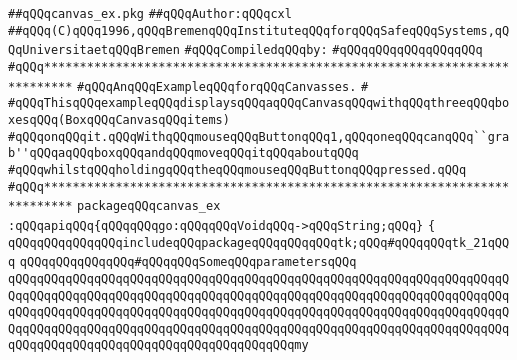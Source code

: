 \label{src/lib/tk/src/tests+examples/canvas_ex.pkg}
\verb|##qQQqcanvas_ex.pkg|\newline
\verb|##qQQqAuthor:qQQqcxl|\newline
\verb|##qQQq(C)qQQq1996,qQQqBremenqQQqInstituteqQQqforqQQqSafeqQQqSystems,qQQqUniversitaetqQQqBremen|\newline
\newline
\verb|#qQQqCompiledqQQqby:|\newline
\verb|#qQQqqQQqqQQqqQQqqQQq|\newline
\newline
\newline
\newline
\verb|#qQQq**************************************************************************|\newline
\verb|#qQQqAnqQQqExampleqQQqforqQQqCanvasses.|\newline
\verb|#|\newline
\verb|#qQQqThisqQQqexampleqQQqdisplaysqQQqaqQQqCanvasqQQqwithqQQqthreeqQQqboxesqQQq(BoxqQQqCanvasqQQqitems)|\newline
\verb|#qQQqonqQQqit.qQQqWithqQQqmouseqQQqButtonqQQq1,qQQqoneqQQqcanqQQq``grab''qQQqaqQQqboxqQQqandqQQqmoveqQQqitqQQqaboutqQQq|\newline
\verb|#qQQqwhilstqQQqholdingqQQqtheqQQqmouseqQQqButtonqQQqpressed.qQQq|\newline
\verb|#qQQq**************************************************************************|\newline
\newline
\newline
\verb|packageqQQqcanvas_ex|\newline
\newline
\verb|:qQQqapiqQQq{qQQqqQQqgo:qQQqqQQqVoidqQQq->qQQqString;qQQq}|\newline
\newline
\verb|{|\newline
\newline
\verb|qQQqqQQqqQQqqQQqincludeqQQqpackageqQQqqQQqqQQqtk;qQQq#qQQqqQQqtk_21qQQq|\newline
\newline
\newline
\verb|qQQqqQQqqQQqqQQq#qQQqqQQqSomeqQQqparametersqQQq|\newline
\newline
\verb|qQQqqQQqqQQqqQQqqQQqqQQqqQQqqQQqqQQqqQQqqQQqqQQqqQQqqQQqqQQqqQQqqQQqqQQqqQQqqQQqqQQqqQQqqQQqqQQqqQQqqQQqqQQqqQQqqQQqqQQqqQQqqQQqqQQqqQQqqQQqqQQqqQQqqQQqqQQqqQQqqQQqqQQqqQQqqQQqqQQqqQQqqQQqqQQqqQQqqQQqqQQqqQQqqQQqqQQqqQQqqQQqqQQqqQQqqQQqqQQqqQQqqQQqqQQqqQQqqQQqqQQqqQQqqQQqqQQqqQQqqQQqqQQqqQQqqQQqqQQqqQQqqQQqqQQqqQQqqQQqmy|\newline
